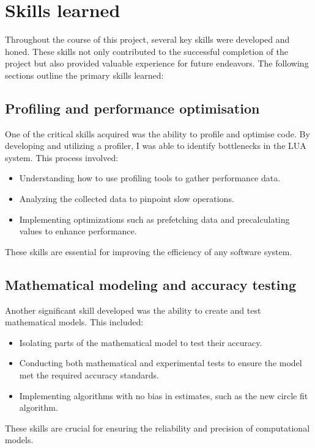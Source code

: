 \section{Skills learned}
\label{sec:skills}

Throughout the course of this project, several key skills were developed and honed. These skills not only contributed to the successful completion of the project but also provided valuable experience for future endeavors. The following sections outline the primary skills learned:

\subsection{Profiling and performance optimisation}
One of the critical skills acquired was the ability to profile and optimise code. By developing and utilizing a profiler, I was able to identify bottlenecks in the LUA system. This process involved:
\begin{itemize}
    \item Understanding how to use profiling tools to gather performance data.
    \item Analyzing the collected data to pinpoint slow operations.
    \item Implementing optimizations such as prefetching data and precalculating values to enhance performance.
\end{itemize}
These skills are essential for improving the efficiency of any software system.

\subsection{Mathematical modeling and accuracy testing}
Another significant skill developed was the ability to create and test mathematical models. This included:
\begin{itemize}
    \item Isolating parts of the mathematical model to test their accuracy.
    \item Conducting both mathematical and experimental tests to ensure the model met the required accuracy standards.
    \item Implementing algorithms with no bias in estimates, such as the new circle fit algorithm.
\end{itemize}
These skills are crucial for ensuring the reliability and precision of computational models.

